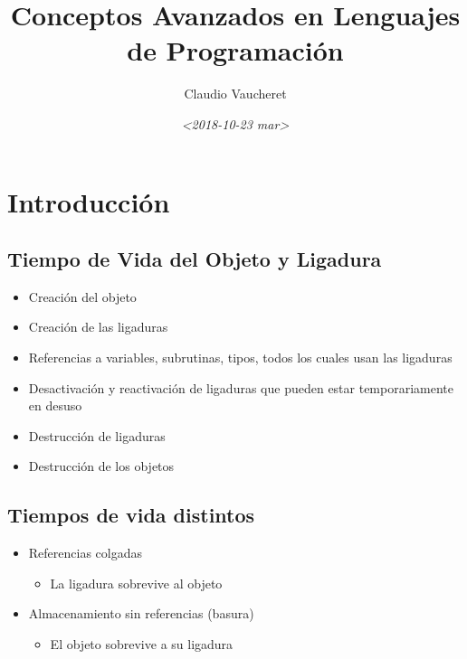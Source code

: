 \documentclass[11pt]{article}
\author{Claudio Vaucheret}
\date{\textit{<2018-10-23 mar>}}
\title{Conceptos Avanzados en Lenguajes de Programación}
\begin{document}
\maketitle

\section*{Introducción}
\label{sec:orgb1faf2d}
\subsection*{Tiempo de Vida del Objeto y Ligadura}
\label{sec:org8caa5d2}

\begin{itemize}
\item Creación del objeto
\item Creación de las ligaduras
\item Referencias a variables, subrutinas, tipos, todos los cuales usan
las ligaduras
\item Desactivación y reactivación de ligaduras que pueden estar
temporariamente en desuso
\item Destrucción de ligaduras
\item Destrucción de los objetos
\end{itemize}

\subsection*{Tiempos de vida distintos}
\label{sec:orge912182}
\begin{itemize}
\item Referencias colgadas
\begin{itemize}
\item La ligadura sobrevive al objeto
\end{itemize}
\item Almacenamiento sin referencias (basura)
\begin{itemize}
\item El objeto sobrevive a su ligadura
\end{itemize}
\end{itemize}
\end{document}
